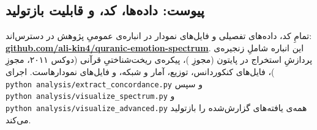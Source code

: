 \documentclass[12pt,a4paper]{article}
\begin{document}
\subsection{پیوست: داده‌ها، کد، و قابلیت
بازتولید}\label{ux67eux6ccux648ux633ux62a-ux62fux627ux62fux647ux647ux627-ux6a9ux62f-ux648-ux642ux627ux628ux644ux6ccux62a-ux628ux627ux632ux62aux648ux644ux6ccux62f-1}

تمامِ کد، داده‌های تفصیلی و فایل‌های نمودار در انباره‌ی عمومیِ پژوهش در
دسترس‌اند:
\textbf{\href{https://github.com/ali-kin4/quranic-emotion-spectrum}{github.com/ali-kin4/quranic-emotion-spectrum}}.
این انباره شاملِ زنجیره‌ی پردازشِ استخراج در پایتون (مجوزِ )، پیکره‌ی
ریخت‌شناختیِ قرآنی (دوکس ۲۰۱۱، مجوزِ )، فایل‌های  کنکوردانس،
توزیع، آمار و شبکه، و فایل‌های  نمودارهاست. اجرای
\texttt{python\ analysis/extract\_concordance.py} و سپس
\texttt{python\ analysis/visualize\_spectrum.py} و
\texttt{python\ analysis/visualize\_advanced.py} همه‌ی یافته‌های گزارش‌شده
را بازتولید می‌کند.
\end{document}
